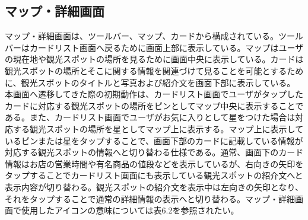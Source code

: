 \subsection{マップ・詳細画面}
マップ・詳細画面は、ツールバー、マップ、カードから構成されている。ツールバーはカードリスト画面へ戻るために画面上部に表示している。マップはユーザの現在地や観光スポットの場所を見るために画面中央に表示している。カードは観光スポットの場所とそこに関する情報を関連づけて見ることを可能とするために、観光スポットのタイトルと写真および紹介文を画面下部に表示している。\\
本画面へ遷移してきた際の初期動作は、カードリスト画面でユーザがタップしたカードに対応する観光スポットの場所をピンとしてマップ中央に表示することである。また、カードリスト画面でユーザがお気に入りとして星をつけた場合は対応する観光スポットの場所を星としてマップ上に表示する。マップ上に表示しているピンまたは星をタップすることで、画面下部のカードに記載している情報が対応する観光スポットの情報へと切り替わる仕様である。通常、画面下のカード情報はお店の営業時間や有名商品の値段などを表示しているが、右向きの矢印をタップすることでカードリスト画面にも表示している観光スポットの紹介文へと表示内容が切り替わる。観光スポットの紹介文を表示中は左向きの矢印となり、それをタップすることで通常の詳細情報の表示へと切り替わる。マップ・詳細画面で使用したアイコンの意味については表6.2を参照されたい。

